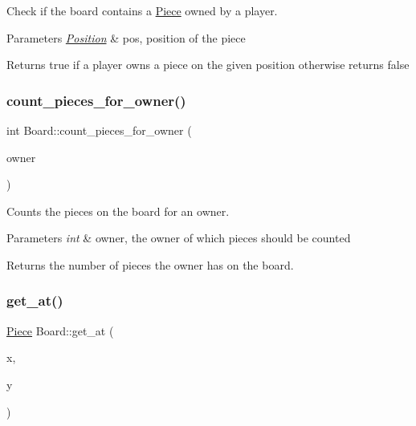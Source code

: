 Check if the board contains a \hyperlink{class_piece}{Piece} owned by a player. 


\begin{DoxyParams}{Parameters}
{\em \hyperlink{struct_position}{Position}} & pos, position of the piece \\
\hline
\end{DoxyParams}
\begin{DoxyReturn}{Returns}
true if a player owns a piece on the given position otherwise returns false 
\end{DoxyReturn}
\mbox{\label{class_board_a810df7b42404d5c0b5c48d7516307d8d}} 
\subsubsection{\texorpdfstring{count\+\_\+pieces\+\_\+for\+\_\+owner()}{count\_pieces\_for\_owner()}}
{\footnotesize\ttfamily int Board\+::count\+\_\+pieces\+\_\+for\+\_\+owner (\begin{DoxyParamCaption}\item[{int}]{owner }\end{DoxyParamCaption})}



Counts the pieces on the board for an owner. 


\begin{DoxyParams}{Parameters}
{\em int} & owner, the owner of which pieces should be counted \\
\hline
\end{DoxyParams}
\begin{DoxyReturn}{Returns}
the number of pieces the owner has on the board. 
\end{DoxyReturn}
\mbox{\label{class_board_a3d8816bd69742e918dff1cc1ee0fc845}} 
\subsubsection{\texorpdfstring{get\+\_\+at()}{get\_at()}}
{\footnotesize\ttfamily \hyperlink{class_piece}{Piece} Board\+::get\+\_\+at (\begin{DoxyParamCaption}\item[{int}]{x,  }\item[{int}]{y }\end{DoxyParamCaption})}




